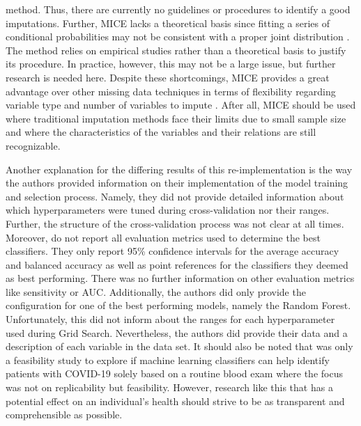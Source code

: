 method. Thus, there are currently no guidelines or procedures to identify a 
good 
imputations. Further, MICE lacks a theoretical basis since fitting a series of 
conditional probabilities may not be consistent with a proper joint 
distribution 
\cite{RN141}. The method relies on empirical studies rather than a theoretical 
basis to justify its procedure. In practice, however, this may not be a large 
issue, but further research is needed here. Despite these shortcomings, MICE 
provides a great advantage over other missing data techniques in terms of 
flexibility regarding variable type and number of variables to impute 
\cite{RN141, RN142}. After all, MICE should be used where traditional 
imputation methods face their limits due to small sample size and where the 
characteristics of the variables and their relations are still recognizable.
\par
Another explanation for the differing results of this re-implementation is the 
way the authors provided information on their implementation of the model 
training and selection process. Namely, they did not provide detailed 
information about which hyperparameters were tuned during cross-validation nor 
their ranges. Further, the structure of the cross-validation process was not 
clear at all times.
\\
Moreover, \citeauthor{RN127} do not report all evaluation metrics used to 
determine the best classifiers. They only report 95\% confidence intervals for 
the average accuracy and balanced accuracy as well as point references for the 
classifiers they deemed as best performing. There was no further information 
on other evaluation metrics like sensitivity or AUC. Additionally, the authors 
did only provide the configuration for one of the best performing models, 
namely the Random Forest. Unfortunately, this did not inform about the ranges 
for each hyperparameter used during Grid Search.
Nevertheless, the authors did provide their data and a description of each 
variable in the data set. It should also be noted that \cite{RN127} was only a 
feasibility study to explore if machine learning classifiers can help identify 
patients with COVID-19 solely based on a routine blood exam where the focus was 
not on replicability but feasibility. However, research like this that has a 
potential effect on an individual's health should strive to be as transparent 
and comprehensible as possible.
